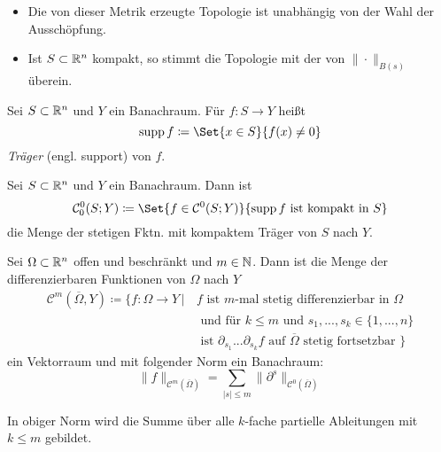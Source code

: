 \documentclass{cheat-sheet}
\begin{document}
\begin{bem}
  \begin{itemize}
    \item Die von dieser Metrik erzeugte Topologie ist unabhängig von der Wahl der Ausschöpfung.
    \item Ist $S \subset \mathbb{R}^n$ kompakt, so stimmt die Topologie mit der von $\| \cdot \|_{B(s)}$ überein.
  \end{itemize}
\end{bem}

\begin{defn}
  Sei $S \subset \mathbb{R}^n$ und $Y$ ein Banachraum. Für $f : S \to Y$ heißt
  \[ \supp f \coloneqq \Set{ x \in S }{ f(x) \not= 0 } \]
  \emph{Träger} (engl. support) von $f$.
\end{defn}

\begin{defn}
  Sei $S \subset \mathbb{R}^n$ und $Y$ ein Banachraum. Dann ist
  \[ \mathcal{C}_0^0(S; Y) \coloneqq \Set{ f \in \mathcal{C}^0(S; Y) }{ \supp f \text{ ist kompakt in } S } \]
  die Menge der stetigen Fktn. mit kompaktem Träger von $S$ nach $Y$.
\end{defn}

\begin{defn}
  Sei $\Omega \subset \mathbb{R}^n$ offen und beschränkt und $m \in \mathbb{N}$. Dann ist die Menge der differenzierbaren Funktionen von $\Omega$ nach $Y$
  \begin{align*}
    \mathcal{C}^m(\overline\Omega, Y) \coloneqq \{ f : \Omega \to Y \,|\, & f \text{ ist $m$-mal stetig differenzierbar in $\Omega$ } \\
    & \text{ und für $k \leq m$ und } s_1, ..., s_k \in \{ 1, ..., n \} \\
    & \text{ ist $\partial_{s_1} ... \partial_{s_k} f$ auf $\overline\Omega$ stetig fortsetzbar } \}
  \end{align*}
  ein Vektorraum und mit folgender Norm ein Banachraum:
  \[ \| f \|_{\mathcal{C}^m(\overline\Omega)} = \sum_{|s| \leq m} \| \partial^s \|_{\mathcal{C}^0(\overline\Omega)} \]
\end{defn}

\begin{bem}
  In obiger Norm wird die Summe über alle $k$-fache partielle Ableitungen mit $k \leq m$ gebildet.
\end{bem}

\end{document}
